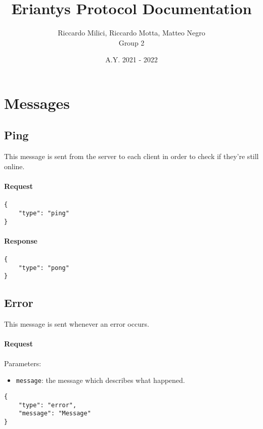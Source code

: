\documentclass[a4paper]{article}
\title{\textbf{Eriantys Protocol Documentation}}
\author{Riccardo Milici, Riccardo Motta, Matteo Negro\\Group 2}
\date{A.Y. 2021 - 2022}
\begin{document}
	\maketitle

	\tableofcontents

	\pagebreak

	\section{Messages}

	\subsection{Ping}

	This message is sent from the server to each client in order to check if they're still online.

	\paragraph{Request}

	\begin{verbatim}
{
	"type": "ping"
}
	\end{verbatim}

	\paragraph{Response}

	\begin{verbatim}
{
	"type": "pong"
}
	\end{verbatim}

	\subsection{Error}

	This message is sent whenever an error occurs.

	\paragraph{Request} Parameters:

	\begin{itemize}
		\item \verb|message|: the message which describes what happened.
	\end{itemize}

	\begin{verbatim}
{
	"type": "error",
	"message": "Message"
}
	\end{verbatim}
\end{document}
